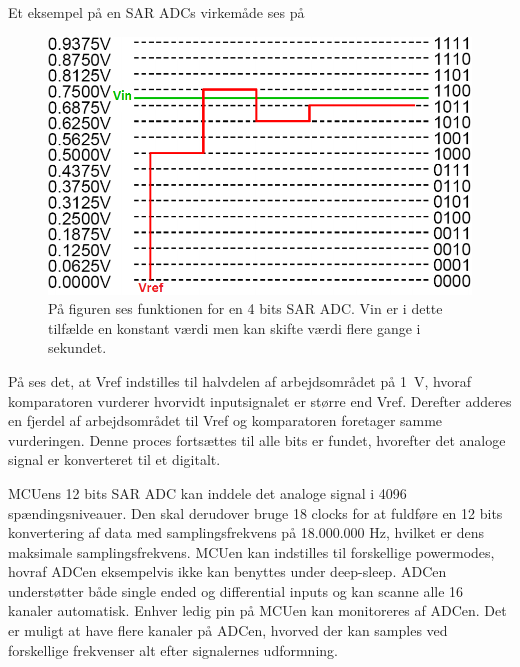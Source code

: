 Et eksempel på en SAR ADCs virkemåde ses på 
\begin{figure}[H]
	\centering
	\includegraphics[scale=0.52]{figures/bProblemloesning/SAR_ADC.png}
	\caption{På figuren ses funktionen for en 4 bits SAR ADC. Vin er i dette tilfælde en konstant værdi men kan skifte værdi flere gange i sekundet.}
	\label{fig:SAR_ADC}
\end{figure}\vspace{-0.5cm}
På  ses det, at Vref indstilles til halvdelen af arbejdsområdet på 1~V, hvoraf komparatoren vurderer hvorvidt inputsignalet er større end Vref. Derefter adderes en fjerdel af arbejdsområdet til Vref og komparatoren foretager samme vurderingen. Denne proces fortsættes til alle bits er fundet, hvorefter det analoge signal er konverteret til et digitalt.

MCUens 12 bits SAR ADC kan inddele det analoge signal i 4096 spændingsniveauer. Den skal derudover bruge 18 clocks for at fuldføre en 12 bits konvertering af data med samplingsfrekvens på 18.000.000 Hz, hvilket er dens maksimale samplingsfrekvens. MCUen kan indstilles til forskellige powermodes, hovraf ADCen eksempelvis ikke kan benyttes under deep-sleep. \newline 
ADCen understøtter både single ended og differential inputs og kan scanne alle 16 kanaler automatisk. Enhver ledig pin på MCUen kan monitoreres af ADCen. Det er muligt at have flere kanaler på ADCen, hvorved der kan samples ved forskellige frekvenser alt efter signalernes udformning. \citep{Semiconductor20164200M}

